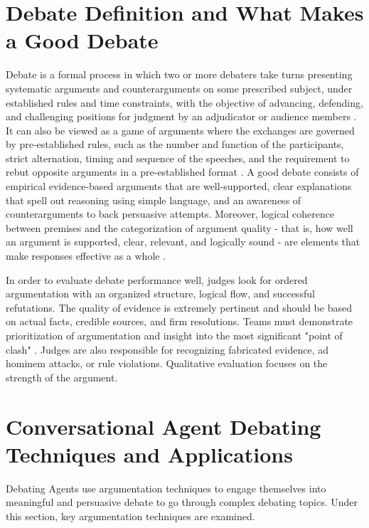 \documentclass[conference]{IEEEtran}
\begin{document}
\section{Debate Definition and What Makes a Good Debate}
Debate is a formal process in which two or more debaters take turns presenting systematic arguments and counterarguments on some prescribed subject, under established rules and time constraints, with the objective of advancing, defending, and challenging positions for judgment by an adjudicator or audience members \cite{rakshit2019debbie}\cite{tan2016winning}. It can also be viewed as a game of arguments where the exchanges are governed by pre-established rules, such as the number and function of the participants, strict alternation, timing and sequence of the speeches, and the requirement to rebut opposite arguments in a pre-established format \cite{engelmann2022argumentation}. A good debate consists of empirical evidence-based arguments that are well-supported, clear explanations that spell out reasoning using simple language, and an awareness of counterarguments to back persuasive attempts. Moreover, logical coherence between premises and the categorization of argument quality - that is, how well an argument is supported, clear, relevant, and logically sound - are elements that make responses effective as a whole \cite{engelmann2022argumentation}.

In order to evaluate debate performance well, judges look for ordered argumentation with an organized structure, logical flow, and successful refutations. The quality of evidence is extremely pertinent and should be based on actual facts, credible sources, and firm resolutions. Teams must demonstrate prioritization of argumentation and insight into the most significant "point of clash" . Judges are also responsible for recognizing fabricated evidence, ad hominem attacks, or rule violations. Qualitative evaluation focuses on the strength of the argument.

\newpage
\section{Conversational Agent Debating Techniques and Applications}
Debating Agents use argumentation techniques to engage themselves into meaningful and persuasive debate to go through complex debating topics. Under this section, key argumentation techniques are examined.
\end{document}
